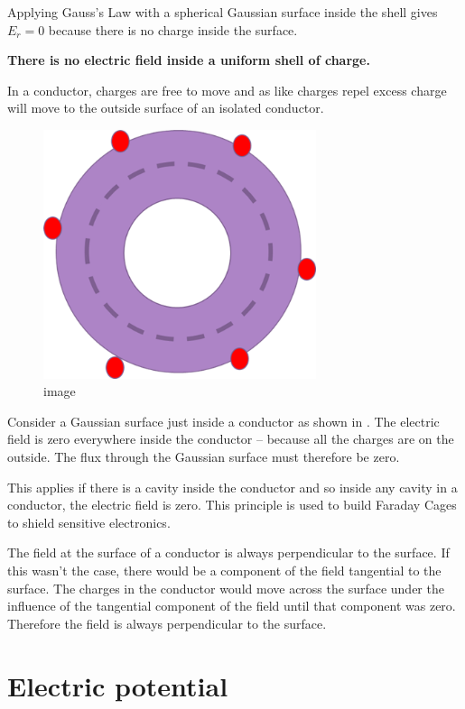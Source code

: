 \documentclass[
]{book}
\begin{document}
Applying Gauss's Law with a spherical Gaussian surface inside the shell
gives \(E_r = 0\) because there is no charge inside the surface.

\textbf{There is no electric field inside a uniform shell of charge.}

In a conductor, charges are free to move and as like charges repel
excess charge will move to the outside surface of an isolated conductor.

\begin{figure}
\centering
\includegraphics[width=80mm,height=\textheight]{Figures/GaussInsideShell.png}
\caption{image}
\end{figure}

Consider a Gaussian surface just inside a conductor as shown in . The
electric field is zero everywhere inside the conductor -- because all
the charges are on the outside. The flux through the Gaussian surface
must therefore be zero.

This applies if there is a cavity inside the conductor and so inside any
cavity in a conductor, the electric field is zero. This principle is
used to build Faraday Cages to shield sensitive electronics.

The field at the surface of a conductor is always perpendicular to the
surface. If this wasn't the case, there would be a component of the
field tangential to the surface. The charges in the conductor would move
across the surface under the influence of the tangential component of
the field until that component was zero. Therefore the field is always
perpendicular to the surface.

\hypertarget{electric-potential}{%
\section{Electric potential}\label{electric-potential}}
\end{document}
